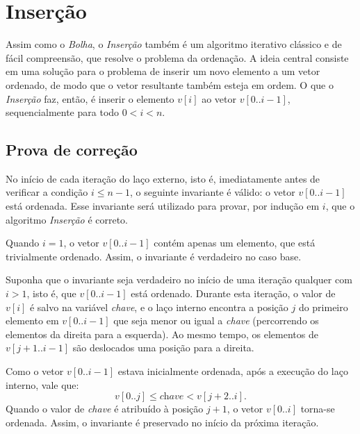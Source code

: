 \section{Inserção}
Assim como o \textit{Bolha}, o \textit{Inserção} também é um algoritmo iterativo clássico e de fácil compreensão, que resolve o problema da ordenação. A ideia central consiste em uma solução para o problema de inserir um novo elemento a um vetor ordenado, de modo que o vetor resultante também esteja em ordem. O que o \textit{Inserção} faz, então, é inserir o elemento $v[i]$ ao vetor $v[0..i-1]$, sequencialmente para todo $0 < i < n$.



\subsection{Prova de correção}
No início de cada iteração do laço externo, isto é, imediatamente antes de verificar a condição $i \leq n-1$, o seguinte invariante é válido: o vetor $v[0..i-1]$ está ordenada. Esse invariante será utilizado para provar, por indução em $i$, que o algoritmo \textit{Inserção} é correto.

Quando $i = 1$, o vetor $v[0..i-1]$ contém apenas um elemento, que está trivialmente ordenado. Assim, o invariante é verdadeiro no caso base.

Suponha que o invariante seja verdadeiro no início de uma iteração qualquer com $i > 1$, isto é, que $v[0..i-1]$ está ordenado. Durante esta iteração, o valor de $v[i]$ é salvo na variável \textit{chave}, e o laço interno encontra a posição $j$ do primeiro elemento em $v[0..i-1]$ que seja menor ou igual a \textit{chave} (percorrendo os elementos da direita para a esquerda). Ao mesmo tempo, os elementos de $v[j+1..i-1]$ são deslocados uma posição para a direita. 

Como o vetor $v[0..i-1]$ estava inicialmente ordenada, após a execução do laço interno, vale que:  
\[
v[0..j] \leq \textit{chave} < v[j+2..i].
\]
Quando o valor de \textit{chave} é atribuído à posição $j+1$, o vetor $v[0..i]$ torna-se ordenada. Assim, o invariante é preservado no início da próxima iteração.

